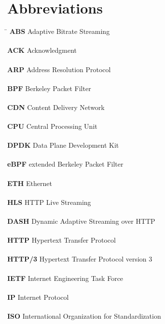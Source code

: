 \chapter*{Abbreviations}\label{chap:abbreviations}

\begin{tabbing}
    \hspace{5cm} \= \kill %
    \textbf{ABS} \> Adaptive Bitrate Streaming
    \\\\\textbf{ACK} \> Acknowledgment
    \\\\\textbf{ARP} \> Address Resolution Protocol 
    \\\\\textbf{BPF} \> Berkeley Packet Filter
    \\\\\textbf{CDN} \> Content Delivery Network
    \\\\\textbf{CPU} \> Central Processing Unit
    \\\\\textbf{DPDK} \> Data Plane Development Kit
    \\\\\textbf{eBPF} \> extended Berkeley Packet Filter
    \\\\\textbf{ETH} \> Ethernet
    \\\\\textbf{HLS} \> HTTP Live Streaming
    \\\\\textbf{DASH} \> Dynamic Adaptive Streaming over HTTP
    \\\\\textbf{HTTP} \> Hypertext Transfer Protocol
    \\\\\textbf{HTTP/3} \> Hypertext Transfer Protocol version 3
    \\\\\textbf{IETF} \> Internet Engineering Task Force
    \\\\\textbf{IP} \> Internet Protocol
    \\\\\textbf{ISO} \>International Organization for Standardization

\end{tabbing}

